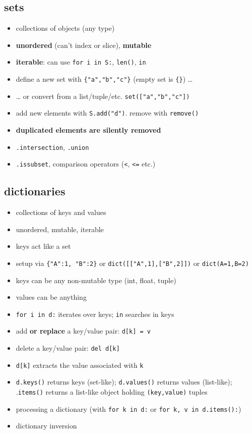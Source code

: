 \documentclass[]{tufte-handout}
\providecommand{\tightlist}{%
  \setlength{\itemsep}{0pt}\setlength{\parskip}{0pt}}
\begin{document}
\hypertarget{sets}{%
\subsection{sets}\label{sets}}

\begin{itemize}
\tightlist
\item
  collections of objects (any type)
\item
  \textbf{unordered} (can't index or slice), \textbf{mutable}
\item
  \textbf{iterable}: can use \texttt{for\ i\ in\ S:}, \texttt{len()},
  \texttt{in}
\item
  define a new set with \texttt{\{"a","b","c"\}} (empty set is
  \texttt{\{\}}) \ldots{}
\item
  \ldots{} or convert from a list/tuple/etc.
  \texttt{set({[}"a","b","c"{]})}
\item
  add new elements with \texttt{S.add("d")}. remove with
  \texttt{remove()}
\item
  \textbf{duplicated elements are silently removed}
\item
  \texttt{.intersection}, \texttt{.union}
\item
  \texttt{.issubset}, comparison operators (\texttt{\textless{}},
  \texttt{\textless{}=} etc.)
\end{itemize}

\hypertarget{dictionaries}{%
\subsection{dictionaries}\label{dictionaries}}

\begin{itemize}
\tightlist
\item
  collections of keys and values
\item
  unordered, mutable, iterable
\item
  keys act like a set
\item
  setup via \texttt{\{"A":1,\ "B":2\}} or
  \texttt{dict({[}{[}"A",1{]},{[}"B",2{]}{]})} or \texttt{dict(A=1,B=2)}
\item
  keys can be any non-mutable type (int, float, tuple)
\item
  values can be anything
\item
  \texttt{for\ i\ in\ d:} iterates over keys; \texttt{in} searches in
  keys
\item
  add \textbf{or replace} a key/value pair: \texttt{d{[}k{]}\ =\ v}
\item
  delete a key/value pair: \texttt{del\ d{[}k{]}}
\item
  \texttt{d{[}k{]}} extracts the value associated with \texttt{k}
\item
  \texttt{d.keys()} returns keys (set-like); \texttt{d.values()} returns
  values (list-like); .\texttt{items()} returns a list-like object
  holding \texttt{(key,value)} tuples
\item
  processing a dictionary (with \texttt{for\ k\ in\ d:} or
  \texttt{for\ k,\ v\ in\ d.items():})
\item
  dictionary inversion
\end{itemize}
\end{document}

